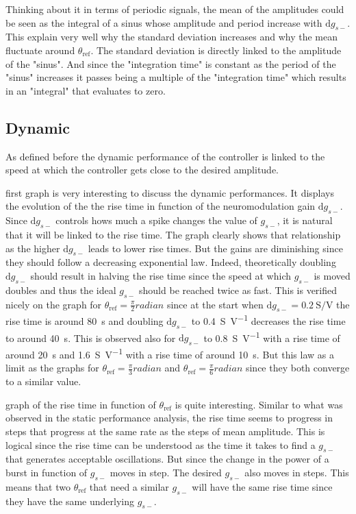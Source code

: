 Thinking about it in terms of periodic signals, the mean of the amplitudes could be seen as the integral of a sinus whose amplitude and period increase with $\mathrm{d}g_{s-}$.
This explain very well why the standard deviation increases and why the mean fluctuate around $\theta_\text{ref}$.
The standard deviation is directly linked to the amplitude of the "sinus". 
And since the "integration time" is constant as the period of the "sinus" increases it passes being a multiple of the "integration time" which results in an "integral" that evaluates to zero.

\subsection{Dynamic}

As defined before the dynamic performance of the controller is linked to the speed at which the controller gets close to the desired amplitude.

 first graph is very interesting to discuss the dynamic performances. 
It displays the evolution of the the rise time in function of the neuromodulation gain $\mathrm{d}g_{s-}$.
Since $\mathrm{d}g_{s-}$ controls hows much a spike changes the value of $g_{s-}$, it is natural that it will be linked to the rise time.
The graph clearly shows that relationship as the higher $\mathrm{d}g_{s-}$ leads to lower rise times.
But the gains are diminishing since they should follow a decreasing exponential law.
Indeed, theoretically doubling $\mathrm{d}g_{s-}$ should result in halving the rise time since the speed at which $g_{s-}$ is moved doubles and thus the ideal $g_{s-}$ should be reached twice as fast.
This is verified nicely on the graph for $\theta_\text{ref}=\frac{\pi}{2}\unit{radian}$ since at the start when $\mathrm{d}g_{s-} = \qty{0.2}{\siemens\per\volt}$ the rise time is around \qty{80}{\second} and doubling $\mathrm{d}g_{s-}$ to \qty{0.4}{\siemens\per\volt} decreases the rise time to around \qty{40}{\second}.
This is observed also for $\mathrm{d}g_{s-}$ to \qty{0.8}{\siemens\per\volt} with a rise time of around \qty{20}{\second} and \qty{1.6}{\siemens\per\volt} with a rise time of around \qty{10}{\second}.
But this law as a limit as the graphs for $\theta_\text{ref}=\frac{\pi}{3}\unit{radian}$ and $\theta_\text{ref}=\frac{\pi}{6}\unit{radian}$ since they both converge to a similar value.

 graph of the rise time in function of $\theta_\text{ref}$ is quite interesting.
Similar to what was observed in the static performance analysis, the rise time seems to progress in steps that progress at the same rate as the steps of mean amplitude.
This is logical since the rise time can be understood as the time it takes to find a $g_{s-}$ that generates acceptable oscillations. 
But since the change in the power of a burst in function of $g_{s-}$ moves in step. The desired $g_{s-}$ also moves in steps. 
This means that two $\theta_\text{ref}$ that need a similar $g_{s-}$ will have the same rise time since they have the same underlying $g_{s-}$.

